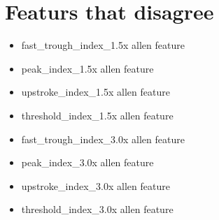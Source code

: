 \section{Featurs that disagree} 
\begin{itemize}

    \item fast\_trough\_index\_1.5x allen feature
    \item peak\_index\_1.5x allen feature
    \item upstroke\_index\_1.5x allen feature
    \item threshold\_index\_1.5x allen feature
    \item fast\_trough\_index\_3.0x allen feature
    \item peak\_index\_3.0x allen feature
    \item upstroke\_index\_3.0x allen feature
    \item threshold\_index\_3.0x allen feature
\end{itemize}



